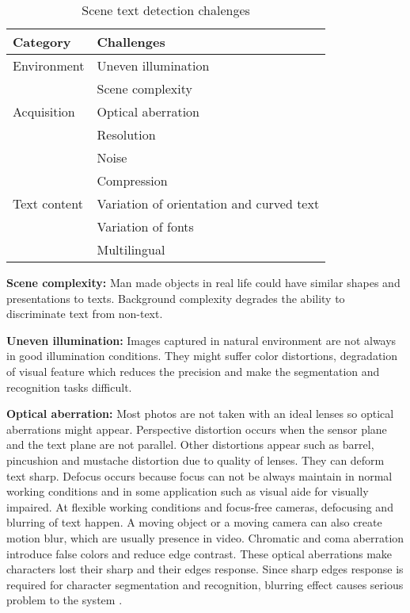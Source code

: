  
\begin{table}
\caption{Scene text detection chalenges}\label{Chalenges}

\centering
\begin{tabular}{|l|l|}

\hline 
\textbf{Category} &\textbf{Challenges} \\ 
\hline 
Environment &Uneven illumination \\ 
	\cline{2-2} 
 	&Scene complexity \\ 
\hline 
Acquisition &Optical aberration \\ 
 	\cline{2-2} 
	 &Resolution \\  	
 	\cline{2-2} 
	 &Noise \\ 	 
 	\cline{2-2} 
	 &Compression \\ 	 
\hline 
Text content &Variation of orientation and curved text \\ 
	\cline{2-2}  
	 &Variation of fonts \\ 
	\cline{2-2} 
 	&Multilingual\\ 
\hline 
\end{tabular} 

\end{table}

\textbf{Scene complexity:} Man made objects in real life could have similar shapes and presentations to texts. Background complexity degrades the ability to discriminate text from non-text.

\textbf{Uneven illumination:} Images captured in natural environment are not always in good illumination conditions. They might suffer color distortions, degradation of visual feature which reduces the precision and make the segmentation and recognition tasks difficult.

\textbf{Optical aberration: } Most photos are not taken with an ideal lenses so optical aberrations might appear. Perspective distortion occurs when the sensor plane and the text plane are not parallel. Other distortions appear such as barrel, pincushion and mustache distortion due to quality of lenses. They can deform text sharp. Defocus occurs because focus can not be always maintain in normal working conditions and in some application such as visual aide for visually impaired. At flexible working conditions and focus-free cameras, defocusing and blurring of text happen. A moving object or a moving camera can also create motion blur, which are usually presence in video. Chromatic and coma aberration introduce false colors and reduce edge contrast. These optical aberrations make characters lost their sharp and their edges response. Since sharp edges response is required for character segmentation and recognition, blurring effect causes serious problem to the system \cite{Liang.2005.IJDAR}.

